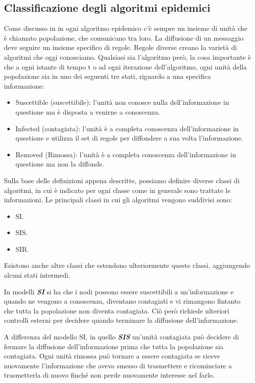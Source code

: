 \subsection{Classificazione degli algoritmi epidemici}
Come discusso in \cite{schindel2004-epidemicAlg} in ogni algoritmo epidemico c'è sempre un insieme di unità che è chiamato popolazione, che comunicano tra loro. La diffusione di un messaggio deve seguire un insieme specifico di regole. Regole diverse creano la varietà di algoritmi che oggi conosciamo. Qualsiasi sia l'algoritmo però, la cosa importante è che a ogni istante di tempo t o ad ogni iterazione dell'algoritmo, ogni unità della popolazione sia in uno dei seguenti tre stati, riguardo a una specifica informazione:
\begin{itemize}
		\item Suscettible (suscettibile): l'unità non conosce nulla dell'informazione in questione ma è disposta a venirne a conoscenza.
		\item Infected (contagiata): l'unità è a completa conoscenza dell'informazione in questione e utilizza il set di regole per diffondere a sua volta l'informazione.
		\item Removed (Rimossa): l'unità è a completa conoscenza dell'informazione in questione ma non la diffonde.
\end{itemize}
Sulla base delle definizioni appena descritte, possiamo definire diverse classi di algoritmi, in cui è indicato per ogni classe come in generale sono trattate le informazioni. Le principali classi in cui gli algoritmi vengono suddivisi sono:
\begin{itemize}
	\item \acf{SI}.
	\item \acf{SIS}.
	\item \acf{SIR}.
	
\end{itemize}
Esistono anche altre classi che estendono ulteriormente queste classi, aggiungendo alcuni stati intermedi.

In modelli \textbf{\textit{\acf{SI}}} si ha che i nodi possono essere suscettibili a un'informazione e quando ne vengono a conoscenza, diventano contagiati e vi rimangono fintanto che tutta la popolazione non diventa contagiata. Ciò però richiede ulteriori controlli esterni per decidere quando terminare la diffusione dell'informazione.

A differenza del modello \acs{SI}, in quello \textbf{\textit{\acf{SIS}}} un'unità contagiata può decidere di fermare la diffusione dell'informazione prima che tutta la popolazione sia contagiata. Ogni unità rimossa può tornare a essere contagiata se riceve nuovamente l'informazione che aveva smesso di trasmettere e ricominciare a trasmetterla di nuovo finché non perde nuovamente interesse nel farlo.

